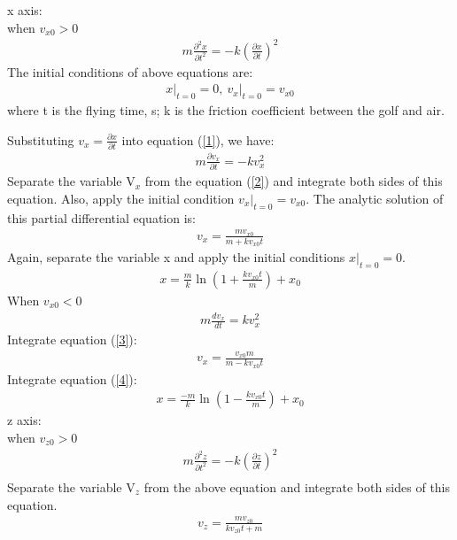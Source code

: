 x axis:\\
when $v_{x 0}>0$
\begin{align}
    m \frac{\partial^{2} x}{\partial t^{2}}=-k\left(\frac{\partial x}{\partial t}\right)^{2}
    \label{1}
\end{align}
The initial conditions of above equations are:
\begin{align}
    \left.x\right|_{t=0}=0,\ \left.v_{x}\right|_{t=0}=v_{x 0}
\end{align}
where t is the flying time, s; k is the friction coefficient between the golf and air.

Substituting $v_{x}=\frac{\partial x}{\partial t}$ into equation (\ref{1}), we have:
\begin{align}
    m \frac{\partial v_{x}}{\partial t}=-k v_{x}^{2}
\label{2}
\end{align}
Separate the variable V$_x$ from the equation (\ref{2}) and integrate both sides of this equation. Also, apply the initial condition $\left.v_{x}\right|_{t=0}=v_{x 0}$. The analytic solution of this partial differential equation is:
\begin{align}
    v_{x}=\frac{m v_{x 0}}{m+k v_{x 0} t}
\end{align}
Again, separate the variable x and apply the initial conditions $\left.x\right|_{t=0}=0$.
\begin{align}
    x=\frac{m}{k} \ln \left(1+\frac{k v_{x 0} t}{m}\right)+x_{0}
\end{align}
When $v_{x 0}<0$
\begin{align}
    m \frac{d v_{x}}{d t}=k v_{x}^{2}
    \label{3}
\end{align}
Integrate equation (\ref{3}):
\begin{align}
    v_{x}=\frac{v_{x 0} m}{m-k v_{x 0} t}
    \label{4}
\end{align}
Integrate equation (\ref{4}):
\begin{align}
x=\frac{-m}{k} \ln \left(1-\frac{k v_{x 0} t}{m}\right)+x_{0}
\end{align}
z axis:\\
when $v_{z 0}>0$
\begin{align}
    m \frac{\partial^{2} z}{\partial t^{2}}=-k\left(\frac{\partial z}{\partial t}\right)^{2}\\
\end{align}
Separate the variable V$_z$ from the above equation and integrate both sides of this equation.
\begin{align}
    v_{z}=\frac{m v_{z 0}}{k v_{z 0} t+m}    
\end{align}
